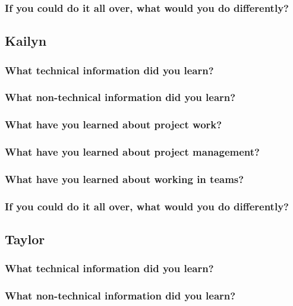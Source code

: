 \documentclass[onecolumn, draftclsnofoot,10pt, compsoc]{IEEEtran}
\begin{document}
\subsubsection{If you could do it all over, what would you do differently?}

\subsection{Kailyn}

\subsubsection{What technical information did you learn?}

\subsubsection{What non-technical information did you learn?}

\subsubsection{What have you learned about project work?}

\subsubsection{What have you learned about project management?}

\subsubsection{What have you learned about working in teams?}

\subsubsection{If you could do it all over, what would you do differently?}

\subsection{Taylor}

\subsubsection{What technical information did you learn?}

\subsubsection{What non-technical information did you learn?}
\end{document}
